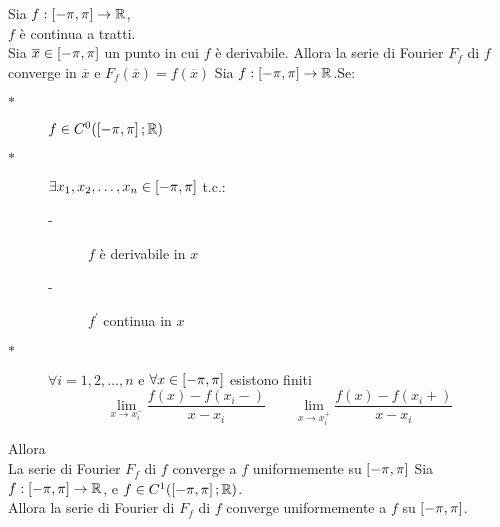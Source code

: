 \corollary
Sia $f:\left[-\pi,\pi\right]\to \mathbb{R}$,\\
$f$ è continua a tratti.\\
Sia $\overline{x}\in\left[-\pi,\pi\right]$ un punto in cui $f$ è derivabile. Allora la serie di Fourier $F_f$ di $f$ converge in $\overline{x}$ e $F_f(\overline{x})=f(\overline{x})$
\proposition
Sia $f:\left[-\pi,\pi\right]\to \mathbb{R}$.Se:\\
\begin{description}
	\item[$\ast$] $f\in C^0(\left[-\pi,\pi\right]; \mathbb{R})$
	\item[$\ast$] $\exists x_1,x_2,\ldots,x_n\in\left[-\pi,\pi\right]$ t.c.:
	\begin{description}
		\item[-] $f$ è derivabile in $x$
		\item[-] $f^{'}$ continua in $x$
	\end{description}
	\item[$\ast$] $\forall i=1,2,\ldots,n$ e $\forall x\in\left[-\pi,\pi\right]$ esistono finiti
	$$\lim\limits_{x\to x_i^{-}}\frac{f(x)-f(x_i-)}{x-x_i}\qquad \lim\limits_{x\to x_i^{+}}\frac{f(x)-f(x_i+)}{x-x_i}$$
	
\end{description}
Allora\\
La serie di Fourier $F_f$ di $f$ converge a $f$ uniformemente su $\left[-\pi,\pi\right]$
\corollary
Sia $f:\left[-\pi,\pi\right]\to \mathbb{R}$, e $f\in C^1(\left[-\pi,\pi\right]; \mathbb{R})$.\\
Allora la serie di Fourier di $F_f$ di $f$ converge uniformemente a $f$ su $\left[-\pi,\pi\right]$.








 
